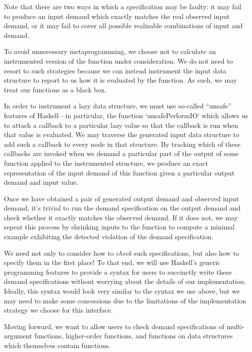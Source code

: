 \documentclass{article}
\begin{document}
Note that there are two ways in which a specification may be faulty:
it may fail to produce an input demand which exactly matches the real
observed input demand, or it may fail to cover all possible realizable
combinations of input and demand.

To avoid unnecessary metaprogramming, we choose not to calculate an
instrumented version of the function under consideration. We do not
need to resort to such strategies because we can instead instrument
the input data structure to report to us how it is evaluated by the
function. As such, we may treat our functions as a black box.

In order to instrument a lazy data structure, we must use so-called
``unsafe'' features of Haskell---in particular, the function
`unsafePerformIO` which allows us to attach a callback to a particular
lazy value so that the callback is run when that value is
evaluated. We may traverse the generated input data structure to add
such a callback to every node in that structure. By tracking which of
these callbacks are invoked when we demand a particular part of the
output of some function applied to the instrumented structure, we
produce an exact representation of the input demand of this function
given a particular output demand and input value.

Once we have obtained a pair of generated output demand and observed
input demand, it's trivial to run the demand specification on the
output demand and check whether it exactly matches the observed
demand. If it does not, we may repeat this process by shrinking inputs
to the function to compute a minimal example exhibiting the detected
violation of the demand specification.

We need not only to consider how to \emph{check} such specifications,
but also how to specify them in the first place! To that end, we will
use Haskell's generic programming features to provide a syntax for
users to succinctly write these demand specifications without worrying
about the details of our implementation. Ideally, this syntax would
look very similar to the syntax we use above, but we may need to make
some concessions due to the limitations of the implementation strategy
we choose for this interface.

Moving forward, we want to allow users to check demand specifications
of multi-argument functions, higher-order functions, and functions on
data structures which themselves contain functions.
\end{document}
